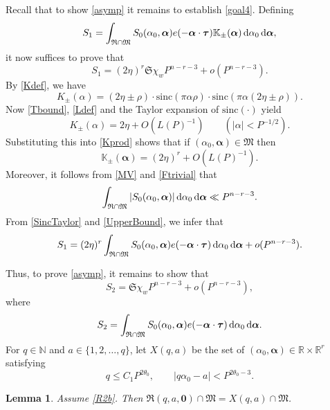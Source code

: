 \documentclass[12pt,reqno]{amsart}
\newtheorem{lemma}[thm]{Lemma}
\theoremstyle{definition}
\theoremstyle{remark}
\numberwithin{equation}{section}
\begin{document}
Recall that to show \eqref{asymp} it remains to establish \eqref{goal4}. Defining
\[
S_1 = \int_{{\mathfrak R} \cap {\mathfrak M}} S_0({{\alpha}}_0, {\boldsymbol{{\alpha}}}) e(-{\boldsymbol{{\alpha}}} \cdot {\boldsymbol{\tau}}) {\mathbb K}_\pm ({\boldsymbol{{\alpha}}}) {{\,{\rm d}}} {{\alpha}}_0 {{\,{\rm d}}} {\boldsymbol{{\alpha}}},
\]
it now suffices to prove that
\[
S_1 = (2\eta)^r {\mathfrak S} \chi_w P^{n - r - 3} + o(P^{n-r-3}).
\]
By \eqref{Kdef}, we have
\[
K_{\pm}({{\alpha}}) = (2 \eta \pm \rho) \cdot {\mathrm{sinc}}(\pi {{\alpha}} \rho) \cdot {\mathrm{sinc}}(\pi {{\alpha}}(2\eta \pm \rho)).
\]
Now \eqref{Tbound}, \eqref{Ldef} and the Taylor expansion of ${\mathrm{sinc}}(\cdot)$ yield
\[
K_{\pm}({{\alpha}}) = 2 \eta + O(L(P)^{-1}) \qquad (|{{\alpha}}| < P^{-1/2}).
\]
Substituting this into \eqref{Kprod} shows that if $({{\alpha}}_0,{\boldsymbol{{\alpha}}}) \in {\mathfrak M}$ then
\begin{equation} \label{SincTaylor}
{\mathbb K}_\pm({\boldsymbol{{\alpha}}}) = (2\eta)^r + O(L(P)^{-1}).
\end{equation}
Moreover, it follows from \eqref{MV} and \eqref{Ftrivial} that
\begin{equation} \label{UpperBound}
\int_{{\mathfrak R} \cap{\mathfrak M}} |S_0({{\alpha}}_0,{\boldsymbol{{\alpha}}})| {{\,{\rm d}}} {{\alpha}}_0 {{\,{\rm d}}} {\boldsymbol{{\alpha}}} \ll P^{n-r-3}.
\end{equation}
From \eqref{SincTaylor} and \eqref{UpperBound}, we infer that
\[
S_1 = (2\eta)^r \int_{{\mathfrak R} \cap {\mathfrak M}} S_0({{\alpha}}_0,{\boldsymbol{{\alpha}}}) e(-{\boldsymbol{{\alpha}}} \cdot {\boldsymbol{\tau}})  {{\,{\rm d}}} {{\alpha}}_0 {{\,{\rm d}}} {\boldsymbol{{\alpha}}} + o(P^{n-r-3}).
\]

Thus, to prove \eqref{asymp}, it remains to show that
\begin{equation} \label{S2goal}
S_2 = {\mathfrak S} \chi_w P^{n - r - 3} + o(P^{n-r-3}),
\end{equation}
where 
\[
S_2 = \int_{{\mathfrak R} \cap {\mathfrak M}} S_0({{\alpha}}_0,{\boldsymbol{{\alpha}}}) e(-{\boldsymbol{{\alpha}}} \cdot {\boldsymbol{\tau}}) {{\,{\rm d}}} {{\alpha}}_0 {{\,{\rm d}}} {\boldsymbol{{\alpha}}}.
\]
For $q \in {\mathbb N}$ and $a \in \{ 1, 2, \ldots, q \}$, let $X(q,a)$ be the set of $({{\alpha}}_0,{\boldsymbol{{\alpha}}}) \in {\mathbb R} \times {\mathbb R}^r$ satisfying 
\[
q {\leqslant} C_1 P^{2 {{\theta}}_0}, \qquad |q{{\alpha}}_0 - a| < P^{2 {{\theta}}_0 - 3}.
\]

\begin{lemma} \label{trick}
Assume \eqref{R2b}. Then ${\mathfrak R}(q,a,{\mathbf 0}) \cap {\mathfrak M} = X(q,a) \cap {\mathfrak M}$.
\end{lemma}
\end{document}
